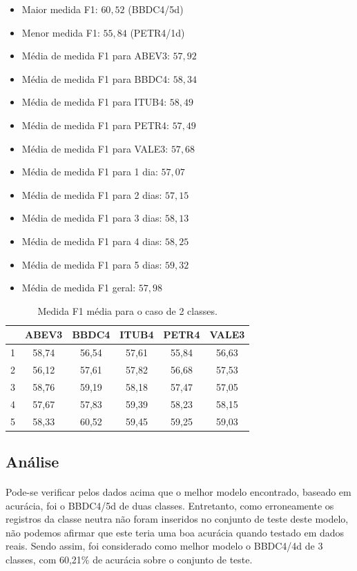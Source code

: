 \documentclass[grad,numbers]{coppe}
\begin{document}
					\begin{itemize}
						\item Maior medida F1: $60,52$ (BBDC4/5d)
						\item Menor medida F1: $55,84$ (PETR4/1d)
						\item Média de medida F1 para ABEV3: $57,92$
						\item Média de medida F1 para BBDC4: $58,34$
						\item Média de medida F1 para ITUB4: $58,49$
						\item Média de medida F1 para PETR4: $57,49$
						\item Média de medida F1 para VALE3: $57,68$
						\item Média de medida F1 para 1 dia: $57,07$
						\item Média de medida F1 para 2 dias: $57,15$
						\item Média de medida F1 para 3 dias: $58,13$
						\item Média de medida F1 para 4 dias: $58,25$
						\item Média de medida F1 para 5 dias: $59,32$
						\item Média de medida F1 geral: $57,98$
					\end{itemize}
		 			\begin{table}[h]
		 				\caption{Medida F1 média para o caso de 2 classes.}
		 				\label{tab:2c_f1_analysis}
		 				\centering
		 				{\footnotesize
		 					\begin{tabular}{|c|c|c|c|c|c|}
		 						\hline
		 						\diagbox[linewidth=0.2pt, width=\dimexpr \textwidth/10+2\tabcolsep\relax, height=0.8cm]{Dias}{Ativo}
		 						& ABEV3 & BBDC4 & ITUB4 & PETR4 & VALE3\\
		 						\hline
		 						1 & 58,74 & 56,54 & 57,61 & 55,84 & 56,63 \\
		 						2 & 56,12 & 57,61 & 57,82 & 56,68 & 57,53 \\
		 						3 & 58,76 & 59,19 & 58,18 & 57,47 & 57,05 \\
		 						4 & 57,67 & 57,83 & 59,39 & 58,23 & 58,15 \\
		 						5 & 58,33 & 60,52 & 59,45 & 59,25 & 59,03 \\
		 						\hline
		 				\end{tabular}}
		 			\end{table}
	 			\subsection{Análise}
	 				\paragraph{}Pode-se verificar pelos dados acima que o melhor modelo encontrado, baseado em acurácia, foi o BBDC4/5d de duas classes. Entretanto, como erroneamente os registros da classe neutra não foram inseridos no conjunto de teste deste modelo, não podemos afirmar que este teria uma boa acurácia quando testado em dados reais. Sendo assim, foi considerado como melhor modelo o BBDC4/4d de 3 classes, com 60,21\% de acurácia sobre o conjunto de teste.
\end{document}
